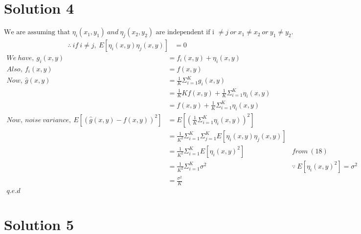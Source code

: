 \documentclass[a4paper,fleqn,11pt]{article}
\theoremstyle{mytheor}
\begin{document}
\section*{Solution 4}
$\text{We are assuming that }\eta_i (x_1, y_1)\ and\ \eta_j (x_2, y_2)\text{ are independent if i }\neq j\ or\ x_1 \neq x_2\ or\ y_1 \neq y_2.$
\begin{align}
\therefore\ if\ i \neq j,\ E[\eta_i(x, y)\eta_j(x, y)] & = 0
\end{align}
\begin{align*}
We\ have,\ g_i(x, y) & = f_i(x, y) + \eta_i(x, y) \\
Also,\ f_i(x, y) & = f(x, y) \\
Now,\ \hat{g}(x, y)& = \frac{1}{K} \Sigma_{i = 1}^K g_i(x, y) \\
& = \frac{1}{K}K f(x, y) + \frac{1}{K}\Sigma_{i = 1}^K \eta_i(x, y) \\
& = f(x, y) + \frac{1}{K}\Sigma_{i = 1}^K \eta_i(x, y) \\
Now,\ noise\ variance,\ E[(\hat{g}(x, y) - f(x, y))^2] & = E[(\frac{1}{K}\Sigma_{i = 1}^K \eta_i(x, y))^2] \\
& = \frac{1}{K^2}\Sigma_{i = 1}^K\Sigma_{j = 1}^K E[\eta_i(x, y)\eta_j(x, y)] \\
& = \frac{1}{K^2}\Sigma_{i = 1}^K E[\eta_i(x, y)^2] & from\ (18) \\
& = \frac{1}{K^2}\Sigma_{i = 1}^K \sigma^2 & \because\ E[\eta_i(x, y)^2] = \sigma^2 \\
& = \frac{\sigma^2}{K} \\
q.e.d
\end{align*}

\section*{Solution 5}
\end{document}
